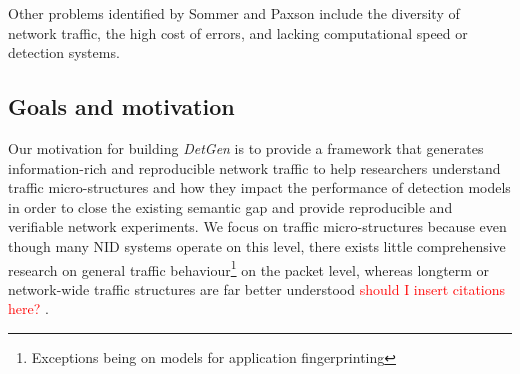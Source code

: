 \documentclass[sigconf]{acmart}
\begin{document}




\vspace{0.2cm}
Other problems identified by Sommer and Paxson include the diversity of network traffic, the high cost of errors, and lacking computational speed or detection systems.

\subsection{Goals and motivation}

Our motivation for building \textit{DetGen} is to provide a framework that generates information-rich and reproducible network traffic to help researchers understand traffic micro-structures and how they impact the performance of detection models in order to close the existing semantic gap and provide reproducible and verifiable network experiments. We focus on traffic micro-structures because even though many NID systems operate on this level, there exists little comprehensive research on general traffic behaviour\footnote{Exceptions being on models for application fingerprinting} on the packet level, whereas longterm or network-wide traffic structures are far better understood \textcolor{red}{should I insert citations here? \cite{willinger1998self}}.
\end{document}
